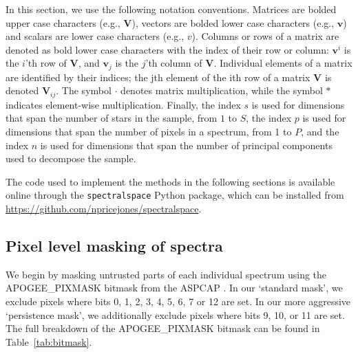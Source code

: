 \documentclass[a4paper,fleqn,usenatbib]{mnras}
\begin{document}
In this section, we use the following notation conventions. Matrices are bolded upper case characters (e.g., $\mathbf{V}$), vectors are bolded lower case characters (e.g., $\mathbf{v}$) and scalars are lower case characters (e.g., $v$). Columns or rows of a matrix are denoted as bold lower case characters with the index of their row or column: $\mathbf{v}^{i}$ is the $i$'th row of $\mathbf{V}$, and $\mathbf{v}_j$ is the $j$'th column of $\mathbf{V}$. Individual elements of a matrix are identified by their indices; the jth element of the ith row of a matrix $\mathbf{V}$ is denoted $\mathbf{V}_{ij}$. The symbol $\cdot$ denotes matrix multiplication, while the symbol $*$ indicates element-wise multiplication. Finally, the index $s$ is used for dimensions that span the number of stars in the sample, from $1$ to $S$, the index $p$ is used for dimensions that span the number of pixels in a spectrum, from 1 to $P$, and the index $n$ is used for dimensions that span the number of principal components used to decompose the sample.%

The code used to implement the methods in the following sections is available online through the \texttt{spectralspace} Python package, which can be installed from \url{https://github.com/npricejones/spectralspace}.

\subsection{Pixel level masking of spectra}

We begin by masking untrusted parts of each individual spectrum using the APOGEE\_PIXMASK bitmask from the ASPCAP \citep{Holtzman2015}. In our `standard mask', we exclude pixels where bits 0, 1, 2, 3, 4, 5, 6, 7 or 12 are set. In our more aggressive `persistence mask', we additionally exclude pixels where bits  9, 10, or 11 are set. The full breakdown of the APOGEE\_PIXMASK bitmask can be found in Table~\ref{tab:bitmask}.

\end{document}
